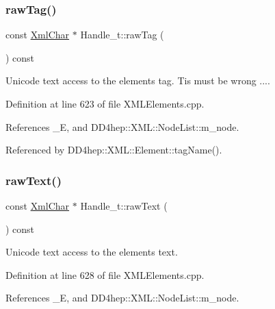 \subsubsection{\texorpdfstring{raw\+Tag()}{rawTag()}}
{\footnotesize\ttfamily const \hyperlink{namespace_d_d4hep_1_1_x_m_l_a09e5d9cc86ed782f6826dfe0778c1815}{Xml\+Char} $\ast$ Handle\+\_\+t\+::raw\+Tag (\begin{DoxyParamCaption}{ }\end{DoxyParamCaption}) const}



Unicode text access to the element\textquotesingle{}s tag. Tis must be wrong .... 



Definition at line 623 of file X\+M\+L\+Elements.\+cpp.



References \+\_\+E, and D\+D4hep\+::\+X\+M\+L\+::\+Node\+List\+::m\+\_\+node.



Referenced by D\+D4hep\+::\+X\+M\+L\+::\+Element\+::tag\+Name().

\hypertarget{class_d_d4hep_1_1_x_m_l_1_1_handle__t_a68f5092f927315bcde262310a750d2a0}{}\label{class_d_d4hep_1_1_x_m_l_1_1_handle__t_a68f5092f927315bcde262310a750d2a0} 
\subsubsection{\texorpdfstring{raw\+Text()}{rawText()}}
{\footnotesize\ttfamily const \hyperlink{namespace_d_d4hep_1_1_x_m_l_a09e5d9cc86ed782f6826dfe0778c1815}{Xml\+Char} $\ast$ Handle\+\_\+t\+::raw\+Text (\begin{DoxyParamCaption}{ }\end{DoxyParamCaption}) const}



Unicode text access to the element\textquotesingle{}s text. 



Definition at line 628 of file X\+M\+L\+Elements.\+cpp.



References \+\_\+E, and D\+D4hep\+::\+X\+M\+L\+::\+Node\+List\+::m\+\_\+node.

\hypertarget{class_d_d4hep_1_1_x_m_l_1_1_handle__t_a1cac092f53be7ae14a2282655acef33d}{}\label{class_d_d4hep_1_1_x_m_l_1_1_handle__t_a1cac092f53be7ae14a2282655acef33d} 
